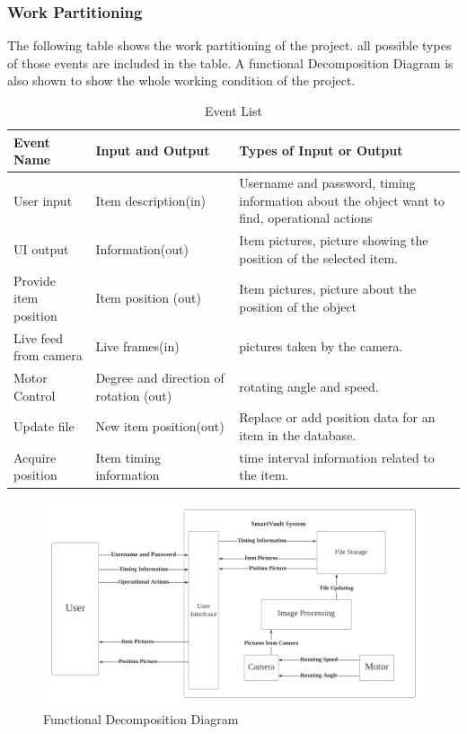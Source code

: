 \documentclass[12pt]{article}
\begin{document}
\subsubsection{Work Partitioning}
The following table shows the work partitioning of the project. all possible types of those events are included in the table. A functional Decomposition Diagram is also shown to show the whole working condition of the project. 
\begin{table}[H]
\caption{Event List} 
\begin{tabularx}{\textwidth}{XXX}
\toprule
\textbf{Event Name} & \textbf{Input and Output} & \textbf{Types of Input or Output}\\
\midrule
User input & Item description(in) & Username and password, timing information about the object want to find, operational  actions\\
UI output &  Information(out) & Item pictures, picture showing the position of the selected item.\\
Provide item position & Item position (out) & Item pictures, picture about the position of the object\\
Live feed from camera & Live frames(in) & pictures taken by the camera.\\
Motor Control& Degree and direction of rotation (out) & rotating angle and speed.\\
Update file & New item position(out) & Replace or add position data for an item in the database.\\
Acquire position & Item timing information & time interval information related to the item.\\

\bottomrule
\end{tabularx}
\end{table}

\begin{figure}[H]
    \centering
    \includegraphics[scale=0.4]{Function_Decom.png}
    \caption{Functional Decomposition Diagram}
\end{figure}
\end{document}
